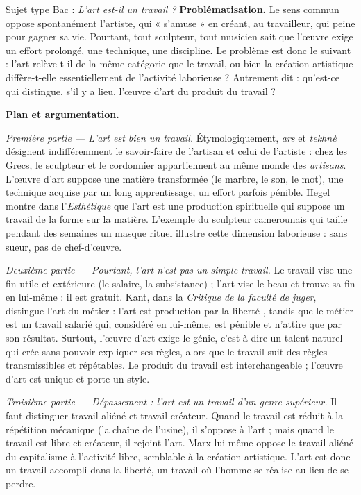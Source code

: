 \documentclass[11pt]{article}
\newcommand{\cle}[1]{{\popxbold\color{popdark}#1}}
\begin{document}
\begin{exoresolu}
Sujet type Bac : \emph{L'art est-il un travail ?}
\tcblower
\textbf{Problématisation.} Le sens commun oppose spontanément l'artiste, qui « s'amuse » en créant, au travailleur, qui peine pour gagner sa vie. Pourtant, tout sculpteur, tout musicien sait que l'œuvre exige un effort prolongé, une technique, une discipline. Le problème est donc le suivant : l'art relève-t-il de la même catégorie que le travail, ou bien la création artistique diffère-t-elle essentiellement de l'activité laborieuse ? Autrement dit : qu'est-ce qui distingue, s'il y a lieu, l'œuvre d'art du produit du travail ?

\textbf{Plan et argumentation.}

\emph{Première partie — L'art est bien un travail.} Étymologiquement, \emph{ars} et \emph{tekhnè} désignent indifféremment le savoir-faire de l'artisan et celui de l'artiste : chez les Grecs, le sculpteur et le cordonnier appartiennent au même monde des \emph{artisans}. L'œuvre d'art suppose une matière transformée (le marbre, le son, le mot), une technique acquise par un long apprentissage, un effort parfois pénible. Hegel montre dans l'\emph{Esthétique} que l'art est une production spirituelle qui suppose un travail de la forme sur la matière. L'exemple du sculpteur camerounais qui taille pendant des semaines un masque rituel illustre cette dimension laborieuse : sans sueur, pas de chef-d'œuvre.

\emph{Deuxième partie — Pourtant, l'art n'est pas un simple travail.} Le travail vise une fin \cle{utile} et extérieure (le salaire, la subsistance) ; l'art vise le \cle{beau} et trouve sa fin en lui-même : il est gratuit. Kant, dans la \emph{Critique de la faculté de juger}, distingue l'art du métier : l'art est \guillemotleft production par la liberté \guillemotright, tandis que le métier est un \guillemotleft travail salarié \guillemotright qui, considéré en lui-même, est pénible et n'attire que par son résultat. Surtout, l'œuvre d'art exige le \cle{génie}, c'est-à-dire un talent naturel qui crée sans pouvoir expliquer ses règles, alors que le travail suit des règles transmissibles et répétables. Le produit du travail est interchangeable ; l'œuvre d'art est unique et porte un \cle{style}.

\emph{Troisième partie — Dépassement : l'art est un travail d'un genre supérieur.} Il faut distinguer travail aliéné et travail créateur. Quand le travail est réduit à la répétition mécanique (la chaîne de l'usine), il s'oppose à l'art ; mais quand le travail est libre et créateur, il rejoint l'art. Marx lui-même oppose le travail aliéné du capitalisme à l'activité libre, semblable à la création artistique. L'art est donc un travail accompli dans la liberté, un travail où l'homme se réalise au lieu de se perdre.


\end{exoresolu}
\end{document}
